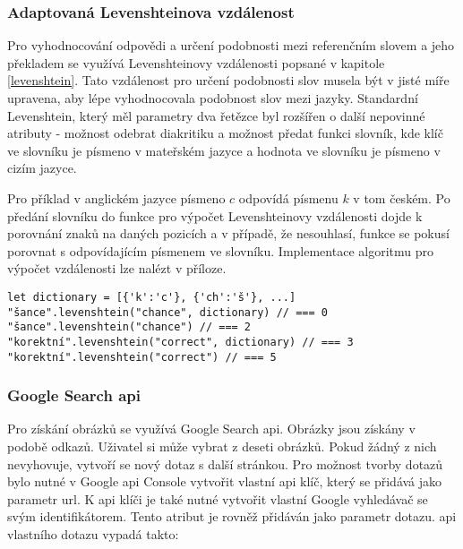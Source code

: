 \documentclass[a4paper,11pt,titlepage,fleqn]{article}
\begin{document}
        \subsubsection{Adaptovaná Levenshteinova vzdálenost}
            Pro vyhodnocování odpovědi a určení podobnosti mezi referenčním slovem a jeho překladem se využívá Levenshteinovy vzdálenosti popsané v kapitole \ref{levenshtein}. Tato vzdálenost pro určení podobnosti slov musela být v jisté míře upravena, aby lépe vyhodnocovala podobnost slov mezi jazyky. Standardní Levenshtein, který měl parametry dva řetězce byl rozšířen o další nepovinné atributy - možnost odebrat diakritiku a možnost předat funkci slovník, kde klíč ve slovníku je písmeno v mateřském jazyce a hodnota ve slovníku je písmeno v cizím jazyce. 

            Pro příklad v anglickém jazyce písmeno $c$ odpovídá písmenu $k$ v tom českém. Po předání slovníku do funkce pro výpočet Levenshteinovy vzdálenosti dojde k porovnání znaků na daných pozicích a v případě, že nesouhlasí, funkce se pokusí porovnat s odpovídajícím písmenem ve slovníku. Implementace algoritmu pro výpočet vzdálenosti lze nalézt v příloze.

\begin{minipage}[c]{0.95\textwidth}
\begin{lstlisting}[language=JS, caption={Příklady použití Levenshteinovy vzdálenosti},label=code:levenshtein]
let dictionary = [{'k':'c'}, {'ch':'š'}, ...]
"šance".levenshtein("chance", dictionary) // === 0
"šance".levenshtein("chance") // === 2
"korektní".levenshtein("correct", dictionary) // === 3
"korektní".levenshtein("correct") // === 5
\end{lstlisting}
\end{minipage}

        \subsubsection{Google Search \gls{api}}
            Pro získání obrázků se využívá Google Search \gls{api}. Obrázky jsou získány v podobě odkazů. Uživatel si může vybrat z deseti obrázků. Pokud žádný z nich nevyhovuje, vytvoří se nový dotaz s další stránkou. Pro možnost tvorby dotazů bylo nutné v Google \gls{api} Console vytvořit vlastní \gls{api} klíč, který se přidává jako parametr \gls{url}. K \gls{api} klíči je také nutné vytvořit vlastní Google vyhledávač se svým identifikátorem. Tento atribut je rovněž přidáván jako parametr dotazu. \gls{api} vlastního dotazu vypadá takto:
\end{document}
